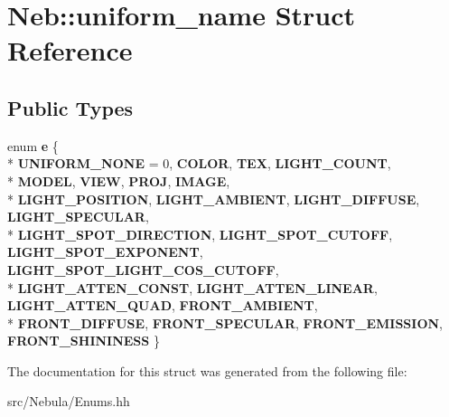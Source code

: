 \hypertarget{structNeb_1_1uniform__name}{\section{Neb\-:\-:uniform\-\_\-name Struct Reference}
\label{structNeb_1_1uniform__name}
}
\subsection*{Public Types}
\begin{DoxyCompactItemize}
\item 
enum {\bfseries e} \{ \\*
{\bfseries U\-N\-I\-F\-O\-R\-M\-\_\-\-N\-O\-N\-E} = 0, 
{\bfseries C\-O\-L\-O\-R}, 
{\bfseries T\-E\-X}, 
{\bfseries L\-I\-G\-H\-T\-\_\-\-C\-O\-U\-N\-T}, 
\\*
{\bfseries M\-O\-D\-E\-L}, 
{\bfseries V\-I\-E\-W}, 
{\bfseries P\-R\-O\-J}, 
{\bfseries I\-M\-A\-G\-E}, 
\\*
{\bfseries L\-I\-G\-H\-T\-\_\-\-P\-O\-S\-I\-T\-I\-O\-N}, 
{\bfseries L\-I\-G\-H\-T\-\_\-\-A\-M\-B\-I\-E\-N\-T}, 
{\bfseries L\-I\-G\-H\-T\-\_\-\-D\-I\-F\-F\-U\-S\-E}, 
{\bfseries L\-I\-G\-H\-T\-\_\-\-S\-P\-E\-C\-U\-L\-A\-R}, 
\\*
{\bfseries L\-I\-G\-H\-T\-\_\-\-S\-P\-O\-T\-\_\-\-D\-I\-R\-E\-C\-T\-I\-O\-N}, 
{\bfseries L\-I\-G\-H\-T\-\_\-\-S\-P\-O\-T\-\_\-\-C\-U\-T\-O\-F\-F}, 
{\bfseries L\-I\-G\-H\-T\-\_\-\-S\-P\-O\-T\-\_\-\-E\-X\-P\-O\-N\-E\-N\-T}, 
{\bfseries L\-I\-G\-H\-T\-\_\-\-S\-P\-O\-T\-\_\-\-L\-I\-G\-H\-T\-\_\-\-C\-O\-S\-\_\-\-C\-U\-T\-O\-F\-F}, 
\\*
{\bfseries L\-I\-G\-H\-T\-\_\-\-A\-T\-T\-E\-N\-\_\-\-C\-O\-N\-S\-T}, 
{\bfseries L\-I\-G\-H\-T\-\_\-\-A\-T\-T\-E\-N\-\_\-\-L\-I\-N\-E\-A\-R}, 
{\bfseries L\-I\-G\-H\-T\-\_\-\-A\-T\-T\-E\-N\-\_\-\-Q\-U\-A\-D}, 
{\bfseries F\-R\-O\-N\-T\-\_\-\-A\-M\-B\-I\-E\-N\-T}, 
\\*
{\bfseries F\-R\-O\-N\-T\-\_\-\-D\-I\-F\-F\-U\-S\-E}, 
{\bfseries F\-R\-O\-N\-T\-\_\-\-S\-P\-E\-C\-U\-L\-A\-R}, 
{\bfseries F\-R\-O\-N\-T\-\_\-\-E\-M\-I\-S\-S\-I\-O\-N}, 
{\bfseries F\-R\-O\-N\-T\-\_\-\-S\-H\-I\-N\-I\-N\-E\-S\-S}
 \}
\end{DoxyCompactItemize}


The documentation for this struct was generated from the following file\-:\begin{DoxyCompactItemize}
\item 
src/\-Nebula/Enums.\-hh\end{DoxyCompactItemize}
